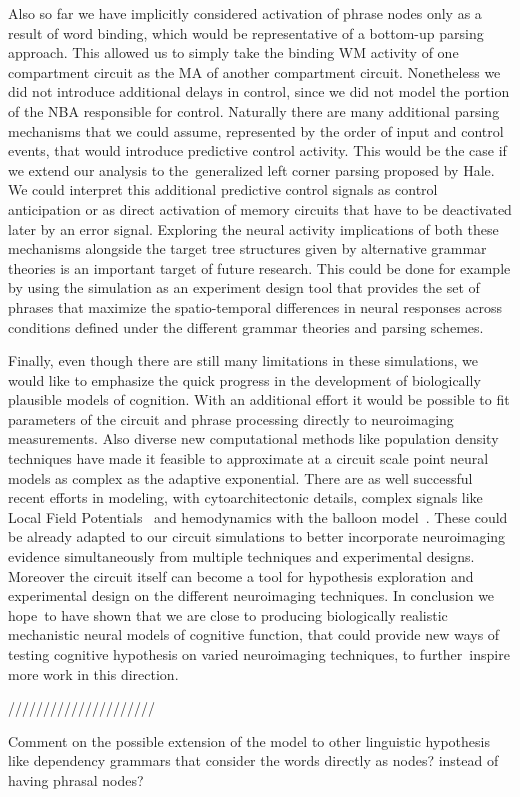 \documentclass[10pt]{article}
\begin{document}
Also so far we have implicitly considered activation of phrase nodes
only as a result of word binding, which would be representative of a
bottom-up parsing approach. This allowed us to simply take the binding
WM activity of one compartment circuit as the MA of another
compartment circuit. Nonetheless we did not introduce additional
delays in control, since we did not model the portion of the NBA
responsible for control. Naturally there are many additional parsing
mechanisms that we could assume, represented by the order of input and
control events, that would introduce predictive control activity. This
would be the case if we extend our analysis to the~generalized left
corner parsing proposed by Hale\cite{hale2014automaton}. We could
interpret this additional predictive control signals as control
anticipation or as direct activation of memory circuits that have to
be deactivated later by an error signal. Exploring the neural activity
implications of both these mechanisms alongside the target tree
structures given by alternative grammar theories is an important
target of future research. This could be done for example by using the
simulation as an experiment design tool that provides the set of
phrases that maximize the spatio-temporal differences in neural
responses across conditions defined under the different grammar
theories and parsing schemes.

Finally, even though there are still many limitations in these
simulations, we would like to emphasize the quick progress in the
development of biologically plausible models of cognition. With an
additional effort it would be possible to fit parameters of the
circuit and phrase processing directly to neuroimaging measurements.
Also diverse new computational methods like population density
techniques have made it feasible to approximate at a circuit scale
point neural models as complex as the adaptive exponential. There are
as well successful recent efforts in modeling, with cytoarchitectonic
details, complex signals like Local Field
Potentials~\cite{Mazzoni_2015,Hagen_2015} and hemodynamics with the
balloon model~\cite{Buxton_2004}. These could be already adapted to
our circuit simulations to better incorporate neuroimaging evidence
simultaneously from multiple techniques and experimental designs.
Moreover the circuit itself can become a tool for hypothesis
exploration and experimental design on the different neuroimaging
techniques. In conclusion we hope~to have shown that we are close to
producing biologically realistic mechanistic neural models of
cognitive function, that could provide new ways of testing cognitive
hypothesis on varied neuroimaging techniques, to further~inspire more
work in this direction.


/////////////////////


Comment on the possible extension of the model to other linguistic hypothesis like dependency grammars that consider the words directly as nodes? instead of having phrasal nodes?




\end{document}
